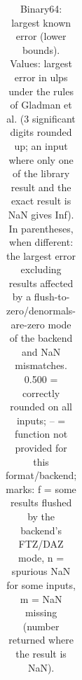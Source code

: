\begin{table}
\begin{small}
\begin{tabular}{|l|cccc|cccc|cc|}
\hline
\end{tabular}
\end{small}
\caption{Binary64: largest known error (lower bounds). Values: largest error in ulps under the rules of Gladman et al. (3 significant digits rounded up; an input where only one of the library result and the exact result is NaN gives Inf). In parentheses, when different: the largest error excluding results affected by a flush-to-zero/denormals-are-zero mode of the backend and NaN mismatches. 0.500 = correctly rounded on all inputs; -- = function not provided for this format/backend; marks: f = some results flushed by the backend's FTZ/DAZ mode, n = spurious NaN for some inputs, m = NaN missing (number returned where the result is NaN). }
\label{tab:b64}
\end{table}
